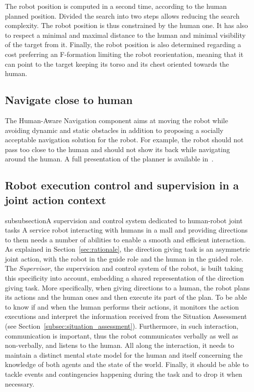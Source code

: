\documentclass[a4paper,11pt,twoside]{StyleThese}
\begin{document}
The robot position is computed in a second time, according to the human planned position. Divided the search into two steps allows reducing the search complexity. The robot position is thus constrained by the human one. It has also to respect a minimal and maximal distance to the human and minimal visibility of the target from it. Finally, the robot position is also determined regarding a cost preferring an F-formation limiting the robot reorientation, meaning that it can point to the target keeping its torso and its chest oriented towards the human.


\subsection{Navigate close to human}\label{subsec:navigation}

The Human-Aware Navigation component aims at moving the robot while avoiding dynamic and static obstacles in addition to proposing a socially acceptable navigation solution for the robot. For example, the robot should not pass too close to the human and should not show its back while navigating around the human. A full presentation of the planner is available in~\cite{singamaneni_2020_hateb}.

\subsection{Robot execution control and supervision in a joint action context}\label{subsec:supervision}

subsubsection{A supervision and control system dedicated to human-robot joint tasks}
A service robot interacting with humans in a mall and providing directions to them needs a number of abilities to enable a smooth and efficient interaction. As explained in Section~\ref{sec:rationale}, the direction giving task is an asymmetric joint action, with the robot in the guide role and the human in the guided role. The \textit{Supervisor}, the supervision and control system of the robot, is built taking this specificity into account, embedding a shared representation of the direction giving task. More specifically, when giving directions to a human, the robot plans its actions and the human ones and then execute its part of the plan. To be able to know if and when the human performs their actions, it monitors the action executions and interpret the information received from the Situation Assessment (see Section~\ref{subsec:situation_assessment}). Furthermore, in such interaction, communication is important, thus the robot communicates verbally as well as non-verbally, and listens to the human. All along the interaction, it needs to maintain a distinct mental state model for the human and itself concerning the knowledge of both agents and the state of the world. Finally, it should be able to tackle events and contingencies happening during the task and to drop it when necessary.
\end{document}
